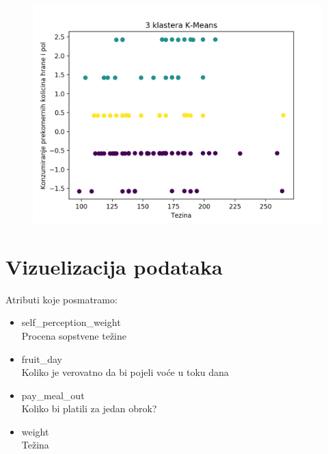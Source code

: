 \documentclass[12pt,a4paper]{article}
\begin{document}
\begin{figure}[H]
  \centering
  \includegraphics[width=15cm]{cluster-3.png}
\end{figure}

\newpage

\section{Vizuelizacija podataka}

Atributi koje posmatramo:
\begin{itemize}
  \item self\_perception\_weight\\
    Procena sopstvene te\v zine
  \item fruit\_day\\
    Koliko je verovatno da bi pojeli vo\' ce u toku dana
  \item pay\_meal\_out\\
    Koliko bi platili za jedan obrok?
   \item weight\\
     Te\v zina
\end{itemize}
\end{document}
